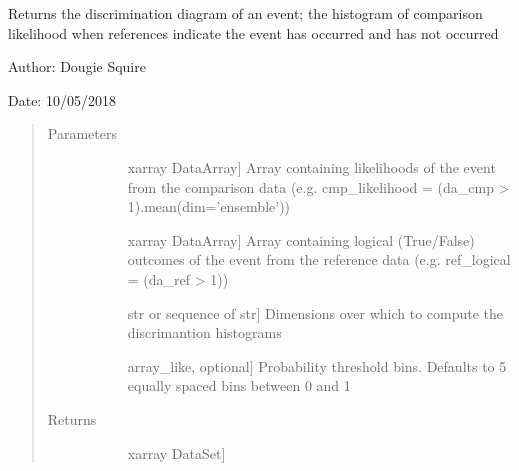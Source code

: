 \documentclass[letterpaper,10pt,english]{sphinxmanual}
\begin{document}

\begin{fulllineitems}
\label{\detokenize{skill_doc:skill.discrimination}}
Returns the discrimination diagram of an event; the histogram of comparison likelihood when                 references indicate the event has occurred and has not occurred

\begin{DUlineblock}{0em}
\item[] Author: Dougie Squire
\item[] Date: 10/05/2018
\end{DUlineblock}
\begin{quote}\begin{description}
\item[{Parameters}] \leavevmode\begin{description}
\item[{}] \leavevmode{[}xarray DataArray{]}
Array containing likelihoods of the event from the comparison data (e.g. cmp\_likelihood =                     (da\_cmp \textgreater{} 1).mean(dim=’ensemble’))

\item[{}] \leavevmode{[}xarray DataArray{]}
Array containing logical (True/False) outcomes of the event from the reference data (e.g.                    ref\_logical = (da\_ref \textgreater{} 1))

\item[{}] \leavevmode{[}str or sequence of str{]}
Dimensions over which to compute the discrimantion histograms

\item[{}] \leavevmode{[}array\_like, optional{]}
Probability threshold bins. Defaults to 5 equally spaced bins between 0 and 1

\end{description}

\item[{Returns}] \leavevmode\begin{description}
\item[{}] \leavevmode{[}xarray DataSet{]}


\end{description}
\end{description}
\end{quote}
\end{fulllineitems}
\end{document}
